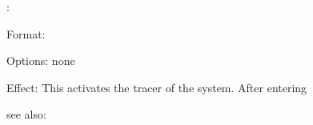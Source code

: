 \rx:

Format: 

Options: none

Effect: This activates the tracer of the \FORWARD{} system. After entering

see also: \, 

